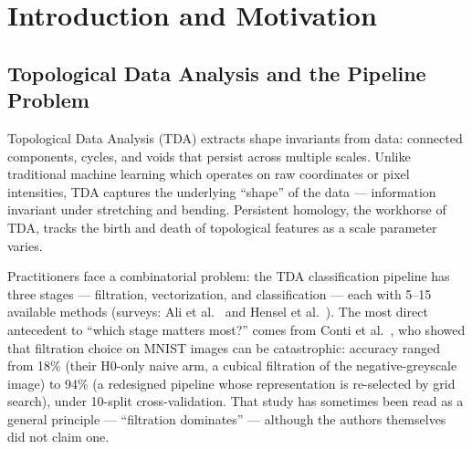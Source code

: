 \documentclass[12pt, a4paper]{report}
\theoremstyle{definition}
\theoremstyle{plain}
\theoremstyle{remark}
\begin{document}
\tableofcontents
\listoffigures
\listoftables
\newpage

\chapter{Introduction and Motivation}
\label{chap:intro}

\section{Topological Data Analysis and the Pipeline Problem}

Topological Data Analysis (TDA) extracts shape invariants from data:
connected components, cycles, and voids that persist across multiple
scales. Unlike traditional machine learning which operates on raw
coordinates or pixel intensities, TDA captures the underlying
``shape'' of the data --- information invariant under stretching and
bending. Persistent homology, the workhorse of TDA, tracks the birth
and death of topological features as a scale parameter varies.

Practitioners face a combinatorial problem: the TDA classification
pipeline has three stages --- filtration, vectorization, and
classification --- each with 5--15 available methods (surveys: Ali et al.\ \cite{ali2023} and Hensel et al.\ \cite{hensel2021}). The most direct antecedent to ``which stage matters most?''
comes from Conti et al.\ \cite{conti2022}, who showed that filtration
choice on MNIST images can be catastrophic: accuracy ranged from 18\% (their H0-only naive arm, a cubical
filtration of the negative-greyscale image) to 94\% (a redesigned
pipeline whose representation is re-selected by grid search), under
10-split cross-validation. That study has sometimes been read
as a general principle --- ``filtration dominates'' --- although the
authors themselves did not claim one.
\end{document}
